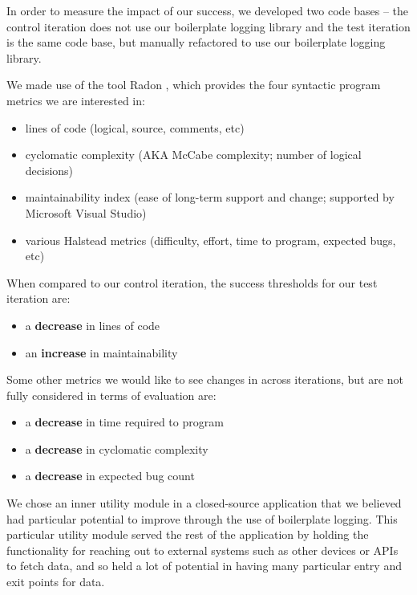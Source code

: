 \documentclass[acmsmall,review,authorversion]{acmart}
\begin{document}
In order to measure the impact of our success, we developed two code bases -- the control iteration does not use our boilerplate logging library and the test iteration is the same code base, but manually refactored to use our boilerplate logging library.

We made use of the tool Radon \cite{radon}, which provides the four syntactic program metrics we are interested in:

\begin{itemize}
    \item lines of code (logical, source, comments, etc)
    \item cyclomatic complexity  \cite{wiki:mccabe} (AKA McCabe complexity; number of logical decisions)
    \item maintainability index (ease of long-term support and change; supported by Microsoft Visual Studio)
    \item various Halstead metrics \cite{wiki:halstead} (difficulty, effort, time to program, expected bugs, etc)
\end{itemize}

When compared to our control iteration, the success thresholds for our test iteration are:

\begin{itemize}
    \item a \textbf{decrease} in lines of code
    \item an \textbf{increase} in maintainability
\end{itemize}

Some other metrics we would like to see changes in across iterations, but are not fully considered in terms of evaluation are:

\begin{itemize}
        \item a \textbf{decrease} in time required to program
    \item a \textbf{decrease} in cyclomatic complexity
    \item a \textbf{decrease} in expected bug count
\end{itemize}

We chose an inner utility module in a closed-source application that we believed had particular potential to improve through the use of boilerplate logging. This particular utility module served the rest of the application by holding the functionality for reaching out to external systems such as other devices or APIs to fetch data, and so held a lot of potential in having many particular entry and exit points for data.
\end{document}
